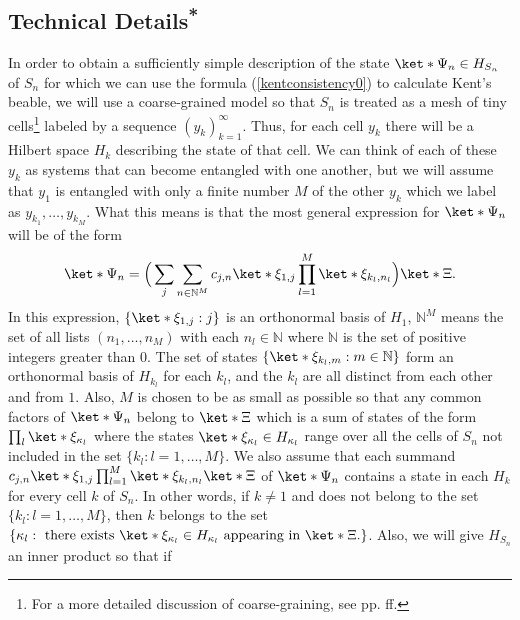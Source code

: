 \documentclass[12pt]{report}
\begin{document}
\subsection{Technical Details\textsuperscript{*}}

In order to obtain a sufficiently simple description of the state $\ket*{\Psi_n}\in H_{S_n}$ of $S_n$ for which we can use the formula (\ref{kentconsistency0}) to calculate Kent's beable, we will  
use a coarse-grained model so that $S_n$ is treated as a mesh of tiny cells\footnote{For a more detailed discussion of coarse-graining, see pp. \pageref{meshref} ff.} labeled by a sequence $(y_k)_{k=1}^\infty$. %
 Thus, for each cell $y_k$ there will be a Hilbert space $H_k$  %
 describing the state of that cell. We can think of each of these $y_k$ as systems that can become entangled with one another, but we will assume that $y_1$ is entangled with only a finite number $M$ of the other $y_k$ which we label as $y_{k_1}, \ldots, y_{k_M}$. %
  What this means is that the most general expression for $\ket*{\Psi_n}$ will be of the form
\begin{equation}\label{Sistate}
\ket*{\Psi_n}=\Big(\sum_j\sum_{n\in\mathbb{N}^M} c_{j,n}\ket*{\xi_{1,j}}\prod_{l=1}^{M}\ket*{\xi_{k_{l},n_l}}\Big)\ket*{\Xi}.
\end{equation}
In this expression, $\{\ket*{\xi_{1,j}}:j\}$ %
%
 is an orthonormal basis of $H_1$, $\mathbb{N}^M$ means the set of all lists $(n_1,\ldots,n_M)$ with each $n_l\in\mathbb{N}$ where $\mathbb{N}$
is the set of positive integers greater than 0. The set of states $\{\ket*{\xi_{k_{l},m}}:m\in\mathbb{N}\}$ form an orthonormal basis of $H_{k_{l}}$ for each $k_l$, and the $k_{l}$ are all distinct from each other and from $1$. Also, $M$ is chosen to be as small as possible so that any common factors of $\ket*{\Psi_n}$ belong to $\ket*{\Xi}$ which is a sum of states of the form $\prod_l\ket*{\xi_{\kappa_l}}$ where the states $\ket*{\xi_{\kappa_l}}\in H_{\kappa_l}$ range over all the cells of $S_n$ not included in the set $\{k_{l}:l=1,\ldots,M\}.$ We also assume that each summand $c_{j,n}\ket*{\xi_{1,j}}\prod_{l=1}^{M}\ket*{\xi_{k_{l},n_l}}\ket*{\Xi}$ of $\ket*{\Psi_n}$ contains a state in each $H_k$ for every cell $k$ of $S_n$. In other words, if $k\neq 1$ and does not belong to the set $\{k_{l}:l=1,\ldots,M\}$, then $k$ belongs to the set $\{\kappa_l:\text{ there exists }\ket*{\xi_{\kappa_l}}\in H_{\kappa_l}\text{ appearing in }\ket*{\Xi}.\}$. Also, we will give $H_{S_n}$ an inner product so that if 
\end{document}
